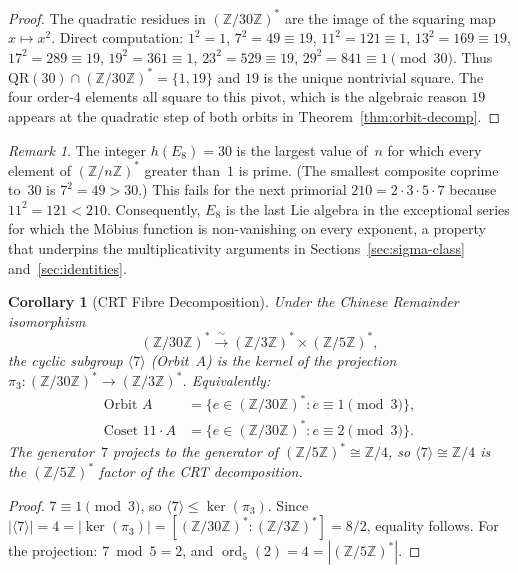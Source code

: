 \documentclass[11pt]{amsart}
\theoremstyle{plain}
\newtheorem{corollary}[theorem]{Corollary}
\theoremstyle{definition}
\theoremstyle{remark}
\newtheorem{remark}[theorem]{Remark}
\newcommand{\ord}{\operatorname{ord}}
\begin{document}
\begin{proof}
The quadratic residues in $(\mathbb{Z}/30\mathbb{Z})^*$ are the image
of the squaring map $x \mapsto x^2$.  Direct computation:
$1^2 = 1$, $7^2 = 49 \equiv 19$, $11^2 = 121 \equiv 1$,
$13^2 = 169 \equiv 19$, $17^2 = 289 \equiv 19$, $19^2 = 361 \equiv 1$,
$23^2 = 529 \equiv 19$, $29^2 = 841 \equiv 1 \pmod{30}$.
Thus $\mathrm{QR}(30) \cap (\mathbb{Z}/30\mathbb{Z})^* = \{1, 19\}$
and $19$ is the unique nontrivial square.  The four order-$4$ elements
all square to this pivot, which is the algebraic reason $19$ appears at
the quadratic step of both orbits in Theorem~\ref{thm:orbit-decomp}.
\end{proof}

\begin{remark}\label{rem:all-prime-exponents}
The integer $h(E_8) = 30$ is the largest value of~$n$ for which every
element of $(\mathbb{Z}/n\mathbb{Z})^*$ greater than~$1$ is prime.
(The smallest composite coprime to~$30$ is $7^2 = 49 > 30$.)
This fails for the next primorial $210 = 2 \cdot 3 \cdot 5 \cdot 7$
because $11^2 = 121 < 210$.  Consequently, $E_8$ is the last Lie algebra
in the exceptional series for which the Möbius function is
non-vanishing on every exponent, a property that underpins the
multiplicativity arguments in Sections~\ref{sec:sigma-class}
and~\ref{sec:identities}.
\end{remark}

\begin{corollary}[CRT Fibre Decomposition]\label{cor:CRT-fibres}
Under the Chinese Remainder isomorphism
\[
  (\mathbb{Z}/30\mathbb{Z})^* \xrightarrow{\;\sim\;}
  (\mathbb{Z}/3\mathbb{Z})^* \times (\mathbb{Z}/5\mathbb{Z})^*,
\]
the cyclic subgroup $\langle 7 \rangle$ (Orbit~$A$) is the kernel of the
projection $\pi_3 \colon (\mathbb{Z}/30\mathbb{Z})^* \to (\mathbb{Z}/3\mathbb{Z})^*$.
Equivalently:
\begin{align*}
  \text{Orbit } A &= \{e \in (\mathbb{Z}/30\mathbb{Z})^* : e \equiv 1 \pmod{3}\}, \\
  \text{Coset } 11 \cdot A &= \{e \in (\mathbb{Z}/30\mathbb{Z})^* : e \equiv 2 \pmod{3}\}.
\end{align*}
The generator~$7$ projects to the generator of $(\mathbb{Z}/5\mathbb{Z})^* \cong \mathbb{Z}/4$,
so $\langle 7 \rangle \cong \mathbb{Z}/4$ is the $(\mathbb{Z}/5\mathbb{Z})^*$ factor
of the CRT decomposition.
\end{corollary}

\begin{proof}
$7 \equiv 1 \pmod{3}$, so $\langle 7 \rangle \le \ker(\pi_3)$.
Since $|\langle 7 \rangle| = 4 = |\ker(\pi_3)| = [(\mathbb{Z}/30\mathbb{Z})^* :
(\mathbb{Z}/3\mathbb{Z})^*] = 8/2$, equality follows.
For the projection: $7 \bmod 5 = 2$, and $\ord_5(2) = 4 = |(\mathbb{Z}/5\mathbb{Z})^*|$.
\end{proof}
\end{document}
